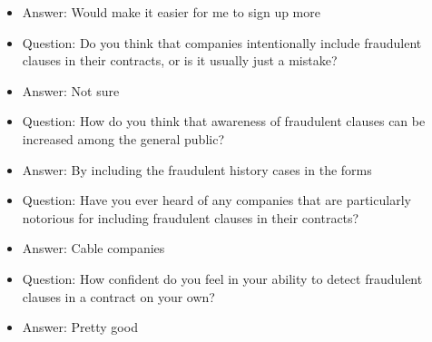 \begin{itemize}
    \item Answer: Would make it easier for me to sign up more

    \item Question: Do you think that companies intentionally include fraudulent clauses in their contracts, or is it usually just a mistake?

    \item Answer: Not sure

    \item Question: How do you think that awareness of fraudulent clauses can be increased among the general public?

    \item Answer: By including the fraudulent history cases in the forms

    \item Question: Have you ever heard of any companies that are particularly notorious for including fraudulent clauses in their contracts?

    \item Answer: Cable companies

    \item Question: How confident do you feel in your ability to detect fraudulent clauses in a contract on your own?

    \item Answer: Pretty good


    \end{itemize}

